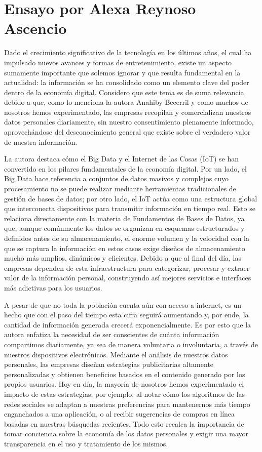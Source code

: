 \section*{Ensayo por Alexa Reynoso Ascencio}

Dado el crecimiento significativo de la tecnología en los últimos años, el cual ha impulsado nuevos avances y formas de entretenimiento, existe un aspecto sumamente importante que solemos ignorar y que resulta fundamental en la actualidad: la información se ha consolidado como un elemento clave del poder dentro de la economía digital. Considero que este tema es de suma relevancia debido a que, como lo menciona la autora Anahiby Becerril y como muchos de nosotros hemos experimentado, las empresas recopilan y comercializan nuestros datos personales diariamente, sin nuestro consentimiento plenamente informado, aprovechándose del desconocimiento general que existe sobre el verdadero valor de nuestra información.

La autora destaca cómo el Big Data y el Internet de las Cosas (IoT) se han convertido en los pilares fundamentales de la economía digital. Por un lado, el Big Data hace referencia a conjuntos de datos masivos y complejos cuyo procesamiento no se puede realizar mediante herramientas tradicionales de gestión de bases de datos; por otro lado, el IoT actúa como una estructura global que interconecta dispositivos para transmitir información en tiempo real. Esto se relaciona directamente con la materia de Fundamentos de Bases de Datos, ya que, aunque comúnmente los datos se organizan en esquemas estructurados y definidos antes de su almacenamiento, el enorme volumen y la velocidad con la que se captura la información en estos casos exige diseños de almacenamiento mucho más amplios, dinámicos y eficientes. Debido a que al final del día, las empresas dependen de esta infraestructura para categorizar, procesar y extraer valor de la información personal, construyendo así mejores servicios e interfaces más adictivas para los usuarios.

A pesar de que no toda la población cuenta aún con acceso a internet, es un hecho que con el paso del tiempo esta cifra seguirá aumentando y, por ende, la cantidad de información generada crecerá exponencialmente. Es por esto que la autora enfatiza la necesidad de ser conscientes de cuánta información compartimos diariamente, ya sea de manera voluntaria o involuntaria, a través de nuestros dispositivos electrónicos. Mediante el análisis de nuestros datos personales, las empresas diseñan estrategias publicitarias altamente personalizadas y obtienen beneficios basados en el contenido generado por los propios usuarios. Hoy en día, la mayoría de nosotros hemos experimentado el impacto de estas estrategias; por ejemplo, al notar cómo los algoritmos de las redes sociales se adaptan a nuestras preferencias para mantenernos más tiempo enganchados a una aplicación, o al recibir sugerencias de compras en línea basadas en nuestras búsquedas recientes. Todo esto recalca la importancia de tomar conciencia sobre la economía de los datos personales y exigir una mayor transparencia en el uso y tratamiento de los mismos.


